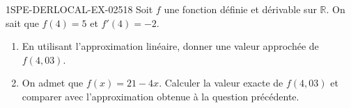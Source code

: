 \begin{exercice}{1SPE-DERLOCAL-EX-025}{1}{8}
Soit $f$ une fonction définie et dérivable sur $\mathbb{R}$. On sait que $f(4) = 5$ et $f'(4) = -2$.

\begin{enumerate}
  \item En utilisant l'approximation linéaire, donner une valeur approchée de $f(4{,}03)$.
  \item On admet que $f(x) = 21 - 4x$. Calculer la valeur exacte de $f(4{,}03)$ et comparer avec l'approximation obtenue à la question précédente.
\end{enumerate}
\end{exercice}
